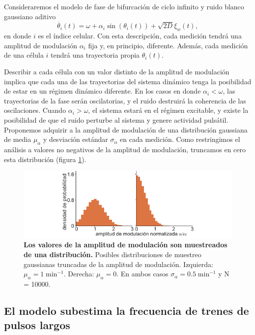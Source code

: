 \documentclass[./main.tex]{subfiles}
\begin{document}
Consideraremos el modelo de fase de bifurcación de ciclo infinito y ruido blanco gaussiano aditivo
\begin{equation}
    \dot{\theta_i}(t) = \omega + \alpha_i \sin{(\theta_i(t))}+ \sqrt{2D} \xi_w(t),
\end{equation}
en donde $i$ es el índice celular. Con esta descripción, cada medición tendrá una amplitud de modulación $\alpha_i$ fija y, en principio, diferente. Además, cada medición de una célula $i$ tendrá una trayectoria propia $\theta_i(t)$. 


Describir a cada célula con un valor distinto de la amplitud de modulación implica que cada una de las trayectorias del sistema dinámico tenga la posibilidad de estar en un régimen dinámico diferente. En los casos en donde $\alpha_i < \omega$, las trayectorias de la fase serán oscilatorias, y el ruido destruirá la coherencia de las oscilaciones. Cuando $\alpha_i > \omega$, el sistema estará en el régimen excitable, y existe la posibilidad de que el ruido perturbe al sistema y genere actividad pulsátil. Proponemos adquirir a la amplitud de modulación de una distribución gaussiana de media $\mu_{\alpha}$ y desviación estándar $\sigma_{\alpha}$ en cada medición. Como restringimos el análisis a valores no negativos de la amplitud de modulación, truncamos en cero esta distribución (figura \ref{C7_fig:dist_def}).


\begin{figure}
    \centering
    \includegraphics[width=1\columnwidth]{figures/chapter7/C7_dist_def.pdf} 
    \caption{\textbf{Los valores de la amplitud de modulación son muestreados de una distribución.} Posibles distribuciones de muestreo gaussianas truncadas de la amplitud de modulación. Izquierda: $\mu_{\alpha} = 1 \; \text{min}^{-1}$. Derecha: $\mu_{\alpha} = 0$. En ambos casos $\sigma_{\alpha} = 0.5 \; \text{min}^{-1}$ y N = 10000. }
    \label{C7_fig:dist_def}
\end{figure} 


\subsection{El modelo subestima la frecuencia de trenes de pulsos largos}
\end{document}
